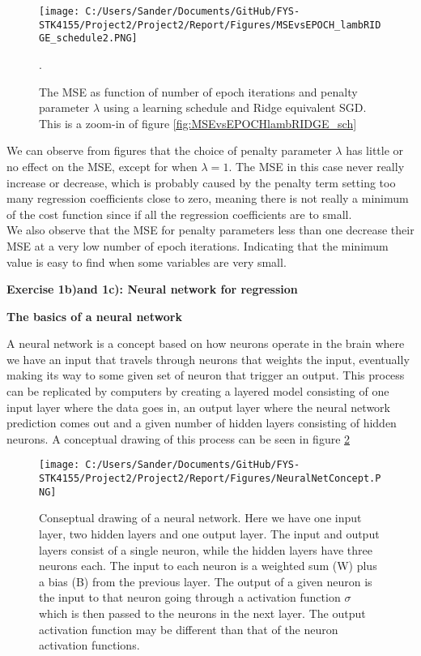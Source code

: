 \documentclass[12pt,a4paper]{article}
\begin{document}
\begin{figure}[H]
\centering
\texttt{[image: C:/Users/Sander/Documents/GitHub/FYS-STK4155/Project2/Project2/Report/Figures/MSEvsEPOCH\_lambRIDGE\_schedule2.PNG]}
\caption{\label{fig:MSEvsEPOCHlambRIDGE_sch2} The MSE as function of number of epoch iterations and penalty parameter $\lambda$ using a learning schedule and Ridge equivalent SGD. This is a zoom-in of figure \ref{fig:MSEvsEPOCHlambRIDGE_sch}}.
\end{figure}

\noindent We can observe from figures that the choice of penalty parameter $\lambda$ has little or no effect on the MSE, except for when $\lambda = 1$. The MSE in this case never really increase or decrease, which is probably caused by the penalty term setting too many regression coefficients close to zero, meaning there is not really a minimum of the cost function since if all the regression coefficients are to small. 
\\
We also observe that the MSE for penalty parameters less than one decrease their MSE at a very low number of epoch iterations. Indicating that the minimum value is easy to find when some variables are very small.

\newpage

\begin{center}
\Large{\textbf{Exercise 1b)and 1c): Neural network for regression}}
\end{center}

\begin{center}
\large{\textbf{The basics of a neural network}}
\end{center}

\noindent A neural network is a concept based on how neurons operate in the brain where we have an input that travels through neurons that weights the input, eventually making its way to some given set of neuron that trigger an output. This process can be replicated by computers by creating a layered model consisting of one input layer where the data goes in, an output layer where the neural network prediction comes out and a given number of hidden layers consisting of hidden neurons. A conceptual drawing of this process can be seen in figure \ref{fig:nnconcept}

\begin{figure}[H]
\centering
\texttt{[image: C:/Users/Sander/Documents/GitHub/FYS-STK4155/Project2/Project2/Report/Figures/NeuralNetConcept.PNG]}
\caption{\label{fig:nnconcept} Conseptual drawing of a neural network. Here we have one input layer, two hidden layers and one output layer. The input and output layers consist of a single neuron, while the hidden layers have three neurons each. The input to each neuron is a weighted sum (W) plus a bias (B) from the previous layer. The output of a given neuron is the input to that neuron going through a activation function $\sigma$ which is then passed to the neurons in the next layer. The output activation function may be different than that of the neuron activation functions.}
\end{figure}
\end{document}

